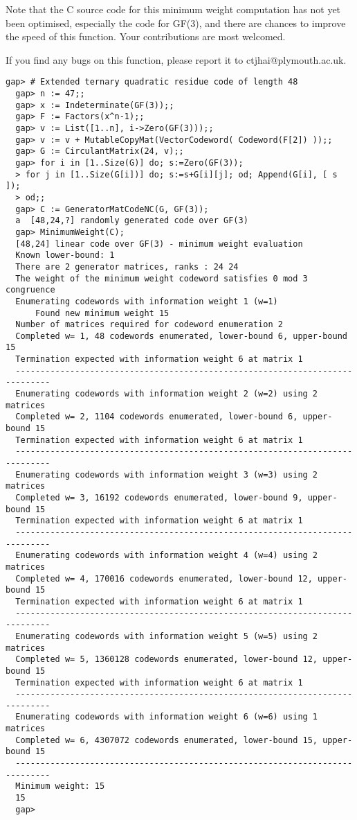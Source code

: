 \documentclass[a4paper,11pt]{report}
\begin{document}
{{{ Note that the C source code for this minimum weight computation has not yet
been optimised, especially the code for GF(3), and there are chances to
improve the speed of this function. Your contributions are most welcomed. 

 If you find any bugs on this function, please report it to
ctjhai@plymouth.ac.uk. }

 
\begin{Verbatim}[fontsize=\small,frame=single,label=Example]
  gap> # Extended ternary quadratic residue code of length 48
  gap> n := 47;;
  gap> x := Indeterminate(GF(3));;
  gap> F := Factors(x^n-1);;
  gap> v := List([1..n], i->Zero(GF(3)));;
  gap> v := v + MutableCopyMat(VectorCodeword( Codeword(F[2]) ));;
  gap> G := CirculantMatrix(24, v);;
  gap> for i in [1..Size(G)] do; s:=Zero(GF(3));
  > for j in [1..Size(G[i])] do; s:=s+G[i][j]; od; Append(G[i], [ s ]);
  > od;;
  gap> C := GeneratorMatCodeNC(G, GF(3));
  a  [48,24,?] randomly generated code over GF(3)
  gap> MinimumWeight(C);
  [48,24] linear code over GF(3) - minimum weight evaluation
  Known lower-bound: 1
  There are 2 generator matrices, ranks : 24 24 
  The weight of the minimum weight codeword satisfies 0 mod 3 congruence
  Enumerating codewords with information weight 1 (w=1)
      Found new minimum weight 15
  Number of matrices required for codeword enumeration 2
  Completed w= 1, 48 codewords enumerated, lower-bound 6, upper-bound 15
  Termination expected with information weight 6 at matrix 1
  -----------------------------------------------------------------------------
  Enumerating codewords with information weight 2 (w=2) using 2 matrices
  Completed w= 2, 1104 codewords enumerated, lower-bound 6, upper-bound 15
  Termination expected with information weight 6 at matrix 1
  -----------------------------------------------------------------------------
  Enumerating codewords with information weight 3 (w=3) using 2 matrices
  Completed w= 3, 16192 codewords enumerated, lower-bound 9, upper-bound 15
  Termination expected with information weight 6 at matrix 1
  -----------------------------------------------------------------------------
  Enumerating codewords with information weight 4 (w=4) using 2 matrices
  Completed w= 4, 170016 codewords enumerated, lower-bound 12, upper-bound 15
  Termination expected with information weight 6 at matrix 1
  -----------------------------------------------------------------------------
  Enumerating codewords with information weight 5 (w=5) using 2 matrices
  Completed w= 5, 1360128 codewords enumerated, lower-bound 12, upper-bound 15
  Termination expected with information weight 6 at matrix 1
  -----------------------------------------------------------------------------
  Enumerating codewords with information weight 6 (w=6) using 1 matrices
  Completed w= 6, 4307072 codewords enumerated, lower-bound 15, upper-bound 15
  -----------------------------------------------------------------------------
  Minimum weight: 15
  15
  gap> 
  

\end{Verbatim}}}
\end{document}
